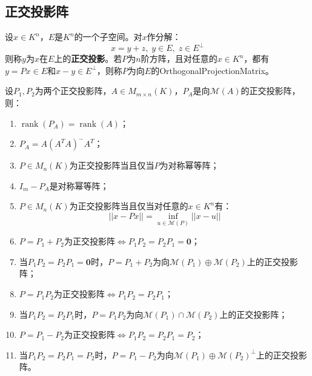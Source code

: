 \subsection{正交投影阵}
\begin{definition}
	设$x\in K^n$，$E$是$K^n$的一个子空间。对$x$作分解：
	\begin{equation*}
		x=y+z,\;y\in E,\;z\in E^\perp
	\end{equation*}
	则称$y$为$x$在$E$上的\textbf{正交投影}。若$P$为$n$阶方阵，且对任意的$x\in K^n$，都有$y=Px\in E$和$x-y\in E^\perp$，则称$P$为向$E$的\gls{OrthogonalProjectionMatrix}。
\end{definition}
\begin{property}\label{prop:OrthogonalProjectionMat}
	设$P_1,P_2$为两个正交投影阵，$A\in M_{m\times n}(K)$，$P_A$是向$\mathcal{M}(A)$的正交投影阵，则：
	\begin{enumerate}
		\item $\operatorname{rank}(P_A)=\operatorname{rank}(A)$；
		\item $P_A=A(A^TA)^-A^T$；
		\item $P\in M_{n}(K)$为正交投影阵当且仅当$P$为对称幂等阵；
		\item $I_m-P_A$是对称幂等阵；
		\item $P\in M_{n}(K)$为正交投影阵当且仅当对任意的$x\in K^n$有：
		\begin{equation*}
			||x-Px||=\inf_{u\in\mathcal{M}(P)}||x-u||
		\end{equation*}
		\item $P=P_1+P_2$为正交投影阵$\iff P_1P_2=P_2P_1=\mathbf{0}$；
		\item 当$P_1P_2=P_2P_1=\mathbf{0}$时，$P=P_1+P_2$为向$\mathcal{M}(P_1)\oplus\mathcal{M}(P_2)$上的正交投影阵；
		\item $P=P_1P_2$为正交投影阵$\iff P_1P_2=P_2P_1$；
		\item 当$P_1P_2=P_2P_1$时，$P=P_1P_2$为向$\mathcal{M}(P_1)\cap\mathcal{M}(P_2)$上的正交投影阵；
		\item $P=P_1-P_2$为正交投影阵$\iff P_1P_2=P_2P_1=P_2$；
		\item 当$P_1P_2=P_2P_1=P_2$时，$P=P_1-P_2$为向$\mathcal{M}(P_1)\oplus\mathcal{M}(P_2)^\perp$上的正交投影阵。
	\end{enumerate}
\end{property}
